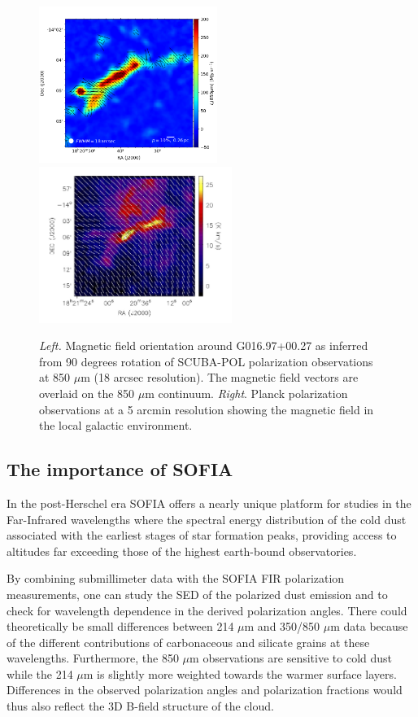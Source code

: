 \documentclass[11pt]{amsart}
\begin{document}
{\begin{figure}[h]
\includegraphics[height=2in]{G16p96_SCUBAPOL_FWHM18.png}
\includegraphics[height=2in]{g16_planckpol.jpg}
\caption{{\it Left.} Magnetic field orientation around G016.97+00.27 as inferred from 90 degrees rotation of SCUBA-POL polarization observations at 850 $\mu$m (18 arcsec resolution). The magnetic field vectors are overlaid on the 850 $\mu$m continuum.
{\it Right}. Planck polarization observations at a 5 arcmin resolution showing the magnetic field in the local galactic environment.
\label{fig:scubapol}}
\end{figure}


\subsection{The importance of SOFIA}

In the post-Herschel era SOFIA offers a nearly unique platform for studies in the Far-Infrared
wavelengths
where the spectral energy distribution of the cold dust associated 
with the earliest stages of star formation peaks, providing access to altitudes far exceeding those of the
highest earth-bound observatories.

By combining submillimeter data with the SOFIA FIR polarization measurements, one can study the SED of the polarized dust emission and to check for wavelength dependence in the derived polarization angles.
There could theoretically be small differences between
214 $\mu$m and 350/850 $\mu$m data because of the different contributions of carbonaceous and silicate grains at these wavelengths. 
Furthermore, the 850 $\mu$m observations are sensitive to cold dust while the 214 $\mu$m is slightly more weighted towards the warmer surface layers.
Differences in the observed polarization angles and polarization fractions would thus also reflect the 3D B-field structure of the cloud.
 
}
\end{document}
